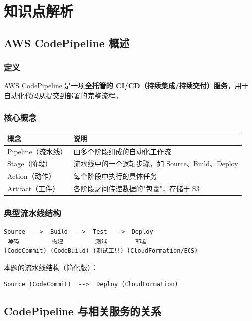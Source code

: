 \documentclass[12pt, a4paper]{article}
\begin{document}
\newpage

\section{知识点解析}

\subsection{AWS CodePipeline 概述}

\subsubsection{定义}

AWS CodePipeline 是一项\textbf{全托管的 CI/CD（持续集成/持续交付）服务}，用于自动化代码从提交到部署的完整流程。

\subsubsection{核心概念}

\begin{tabularx}{\textwidth}{lX}
  \toprule
  \textbf{概念} & \textbf{说明} \\
  \midrule
  Pipeline（流水线） & 由多个阶段组成的自动化工作流 \\
  Stage（阶段） & 流水线中的一个逻辑步骤，如 Source、Build、Deploy \\
  Action（动作） & 每个阶段中执行的具体任务 \\
  Artifact（工件） & 各阶段之间传递数据的"包裹"，存储于 S3 \\
  \bottomrule
\end{tabularx}

\subsubsection{典型流水线结构}

\begin{lstlisting}
Source  -->  Build  -->  Test  -->  Deploy
 源码         构建         测试        部署
(CodeCommit) (CodeBuild) (测试工具) (CloudFormation/ECS)
\end{lstlisting}

本题的流水线结构（简化版）：
\begin{lstlisting}
Source (CodeCommit)  -->  Deploy (CloudFormation)
\end{lstlisting}

\subsection{CodePipeline 与相关服务的关系}
\end{document}
